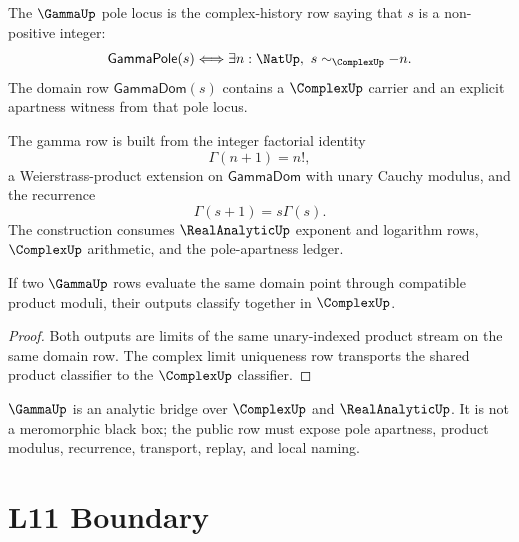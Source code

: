 \begin{definition}
\label{def:analysis-spine-gamma-domain}
The $\GammaUp$ pole locus is the complex-history row saying that $s$ is a
non-positive integer:
$$
\mathsf{GammaPole}(s)
\Longleftrightarrow
\exists n:\NatUp,\ s\sim_{\ComplexUp}-n.
$$
The domain row $\mathsf{GammaDom}(s)$ contains a $\ComplexUp$ carrier and an
explicit apartness witness from that pole locus.
\end{definition}

\begin{definition}
\label{def:analysis-spine-gamma-product}
The gamma row is built from the integer factorial identity
$$
\Gamma(n+1)=n!,
$$
a Weierstrass-product extension on $\mathsf{GammaDom}$ with unary Cauchy
modulus, and the recurrence
$$
\Gamma(s+1)=s\Gamma(s).
$$
The construction consumes $\RealAnalyticUp$ exponent and logarithm rows,
$\ComplexUp$ arithmetic, and the pole-apartness ledger.
\end{definition}

\begin{theorem}
\label{thm:analysis-spine-gamma-uniqueness}
If two $\GammaUp$ rows evaluate the same domain point through compatible
product moduli, their outputs classify together in $\ComplexUp$.
\end{theorem}

\begin{proof}
Both outputs are limits of the same unary-indexed product stream on the same
domain row.  The complex limit uniqueness row transports the shared product
classifier to the $\ComplexUp$ classifier.
\end{proof}

\begin{principle}
\label{prin:analysis-spine-gamma-boundary}
$\GammaUp$ is an analytic bridge over $\ComplexUp$ and $\RealAnalyticUp$.
It is not a meromorphic black box; the public row must expose pole
apartness, product modulus, recurrence, transport, replay, and local naming.
\end{principle}


\section{L11 Boundary}
\label{sec:analysis-spine-boundary}

